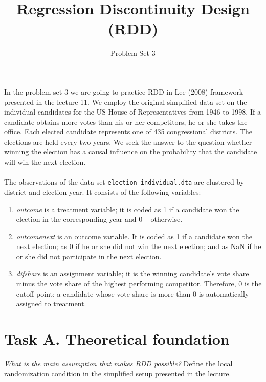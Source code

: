 

\title{Regression Discontinuity Design (RDD)}
\subtitle{-- Problem Set 3 --}
\date{}

\maketitle\vspace{-2cm}

In the problem set 3 we are going to practice RDD in Lee (2008) framework presented in the lecture 11. We employ the original simplified data set on the individual candidates for the US House of Representatives from 1946 to 1998. If a candidate obtains more votes than his or her competitors, he or she takes the office.  Each elected candidate represents one of 435 congressional districts. The elections are held every two years. We seek the answer to the question whether winning the election has a causal influence on the probability that the candidate will win the next election.\\
\\
The observations of the data set \texttt{election-individual.dta} are clustered by district and election year. It consists of the following variables:
\begin{enumerate}

\item \emph{outcome} is a treatment variable; it is coded as 1 if a candidate won the election in the corresponding year and 0 -- otherwise. 
\item \emph{outcomenext} is an outcome variable. It is coded as 1 if a candidate won the next election; as 0 if he or she did not win the next election; and as NaN if he or she did not participate in the next election. 
\item \emph{difshare} is an assignment variable; it is the winning candidate's vote share minus the vote share of the highest performing competitor. Therefore, 0 is the cutoff point: a candidate whose vote share is more than 0 is automatically assigned to treatment.

\end {enumerate}

\section*{Task A. Theoretical foundation} 

\begin{boenumerate}

  \item \emph{What is the main assumption that makes RDD possible?} Define the local randomization condition in the simplified setup presented in the lecture.

\end{boenumerate}


